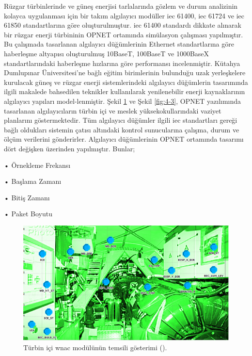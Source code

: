 Rüzgar türbinlerinde ve güneş enerjisi tarlalarında gözlem ve durum analizinin kolayca uygulanması için bir takım algılayıcı modüller \gls{iec} 61400, \gls{iec} 61724 ve \gls{iec} 61850 standartlarına göre oluşturulmuştur\cite{ahmed2011simulation}. \gls{iec} 61400 standardı dikkate alınarak bir rüzgar enerji türbininin OPNET ortamında simülasyon çalışması yapılmıştır. Bu çalışmada tasarlanan algılayıcı düğümlerinin Ethernet standartlarına göre haberleşme altyapısı oluşturulmuş 10BaseT, 100BaseT ve 1000BaseX standartlarındaki haberleşme hızlarına göre performansı incelenmiştir.
Kütahya Dumlupınar Üniversitesi'ne bağlı eğitim birimlerinin bulunduğu uzak yerleşkelere kurulacak güneş ve rüzgar enerji sistemlerindeki algılayıcı düğümlerin tasarımında ilgili makalede bahsedilen teknikler kullanılarak yenilenebilir enerji kaynaklarının algılayıcı yapıları model-lenmiştir. Şekil \ref{fig:4-2} ve Şekil \ref{fig:4-3}, OPNET yazılımında tasarlanan algılayıcıların türbin içi ve meslek yüksekokullarındaki vaziyet planlarını göstermektedir. Tüm algılayıcı düğümler ilgili \gls{iec} standartları gereği bağlı oldukları sistemin çatısı altındaki kontrol sunucularına çalışma, durum ve ölçüm verilerini gönderirler. Algılayıcı düğümlerinin OPNET ortamında tasarımı dört değişken üzerinden yapılmıştır\cite{ahmed2011simulation}. Bunlar;

•	Örnekleme Frekansı

•	Başlama Zamanı

•	Bitiş Zamanı

•	Paket Boyutu

\begin{figure}[htbp]
\centerline{\includegraphics[width=\columnwidth]{Resim/Sekil4-2.png}}
\caption{Türbin içi \gls{wnac} modülünün temsili gösterimi (\protect{}).}
\label{fig:4-2}
\end{figure}


